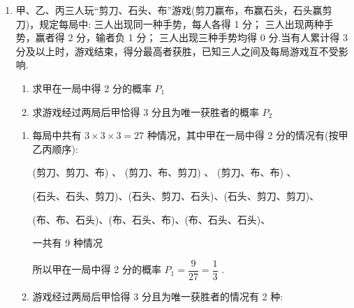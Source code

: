 \begin{enumerate}
\begin{enumerate}
\begin{jieda}
\begin{enumerate}
                所以任取一只小猫摆件，得到黑猫、白猫、红猫的概率分别是 $\dfrac{3}{7}\dfrac{2}{7}\dfrac{2}{7}$

                \item 从7只小猫摆件中取出两只小猫摆件的基本事件有 $C_7^2 = 21$ 个，其中两只摆件是黑猫的基本事件有3个，两只白猫的基本事件 1 个，两只红猫的基本事件有1个
                
                于是两只小猫摆件同色的概率为 $\dfrac{3 + 1 + 1}{21} = \dfrac{5}{21}$ ,
                
                则两只小猫摆件颜色不相同的概率是 $1 - \dfrac{5}{21} = \dfrac{16}{21}$ .
            \end{enumerate}
        \end{jieda}
        \item 甲、乙、丙三人玩“剪刀、石头、布”游戏(剪刀赢布，布赢石头，石头赢剪刀)，规定每局中:  三人出现同一种手势，每人各得 1 分；  三人出现两种手势，赢者得 2 分，输者负 1 分；  三人出现三种手势均得 0 分.当有人累计得 3 分及以上时，游戏结束，得分最高者获胜，已知三人之间及每局游戏互不受影响.
        \begin{enumerate}
            \item 求甲在一局中得 2 分的概率 ${P}_{1}$
            \item 求游戏经过两局后甲恰得 3 分且为唯一获胜者的概率 ${P}_{2}$
        \end{enumerate}
        \begin{jieda}
            \begin{enumerate}
                \item 每局中共有 $3\times3\times3=27$ 种情况，其中甲在一局中得 2 分的情况有(按甲乙丙顺序):
                
                (剪刀、剪刀、布) 、 (剪刀、布、剪刀) 、 (剪刀、布、布) 、
                
                (石头、石头、剪刀)、(石头、剪刀、石头)、(石头、剪刀、剪刀)、
                
                (布、布、石头)、(布、石头、布)、(布、石头、石头)、
                
                一共有 9 种情况
                
                所以甲在一局中得 2 分的概率 ${P}_{1} = \dfrac{9}{27} = \dfrac{1}{3}$ .

                \item 游戏经过两局后甲恰得 3 分且为唯一获胜者的情况有 2 种:
\end{enumerate}
\end{jieda}
\end{enumerate}
\end{enumerate}
